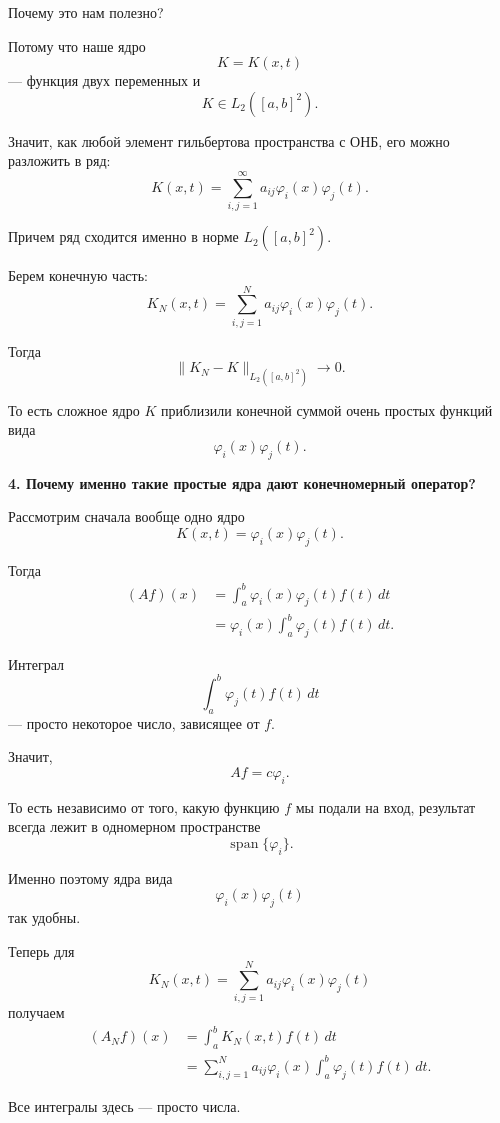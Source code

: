 \begin{idea}
	Почему это нам полезно?
	
	Потому что наше ядро
	\[
	K=K(x,t)
	\]
	--- функция двух переменных и
	\[
	K\in L_2([a,b]^2).
	\]
	
	Значит, как любой элемент гильбертова пространства с ОНБ,
	его можно разложить в ряд:
	\[
	K(x,t)
	=
	\sum_{i,j=1}^{\infty}
	a_{ij}\varphi_i(x)\varphi_j(t).
	\]
	
	Причем ряд сходится именно в норме \(L_2([a,b]^2)\).
	
	Берем конечную часть:
	\[
	K_N(x,t)
	=
	\sum_{i,j=1}^{N}
	a_{ij}\varphi_i(x)\varphi_j(t).
	\]
	
	Тогда
	\[
	\boxed{
		\|K_N-K\|_{L_2([a,b]^2)}
		\to0.
	}
	\]
	
	То есть сложное ядро \(K\) приблизили конечной суммой очень простых
	функций вида
	\[
	\varphi_i(x)\varphi_j(t).
	\]
	
	\medskip
	
	\textbf{4. Почему именно такие простые ядра дают конечномерный оператор?}
	
	Рассмотрим сначала вообще одно ядро
	\[
	K(x,t)=\varphi_i(x)\varphi_j(t).
	\]
	
	Тогда
	\[
	\begin{aligned}
		(Af)(x)
		&=
		\int_a^b
		\varphi_i(x)\varphi_j(t)f(t)\,dt
		\\
		&=
		\varphi_i(x)
		\int_a^b\varphi_j(t)f(t)\,dt.
	\end{aligned}
	\]
	
	Интеграл
	\[
	\int_a^b\varphi_j(t)f(t)\,dt
	\]
	--- просто некоторое число, зависящее от \(f\).
	
	Значит,
	\[
	Af=c\varphi_i.
	\]
	
	То есть независимо от того, какую функцию \(f\) мы подали на вход,
	результат всегда лежит в одномерном пространстве
	\[
	\operatorname{span}\{\varphi_i\}.
	\]
	
	Именно поэтому ядра вида
	\[
	\varphi_i(x)\varphi_j(t)
	\]
	так удобны.
	
	\medskip
	
	Теперь для
	\[
	K_N(x,t)
	=
	\sum_{i,j=1}^{N}
	a_{ij}\varphi_i(x)\varphi_j(t)
	\]
	получаем
	\[
	\begin{aligned}
		(A_Nf)(x)
		&=
		\int_a^bK_N(x,t)f(t)\,dt
		\\
		&=
		\sum_{i,j=1}^{N}
		a_{ij}\varphi_i(x)
		\int_a^b\varphi_j(t)f(t)\,dt.
	\end{aligned}
	\]
	
	Все интегралы здесь --- просто числа.
	

\end{idea}

